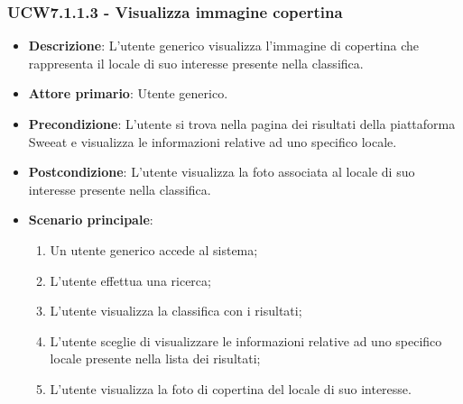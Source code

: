\subsubsection{UCW7.1.1.3 - Visualizza immagine copertina}
\begin{itemize}
	\item \textbf{Descrizione}: L'utente generico visualizza l'immagine di copertina che rappresenta il locale di suo interesse presente nella classifica.
    \item \textbf{Attore primario}: Utente generico.
    \item \textbf{Precondizione}: L’utente si trova nella pagina dei risultati della piattaforma Sweeat e visualizza le informazioni relative ad uno specifico locale.
    \item \textbf{Postcondizione}: L’utente visualizza la foto associata al locale di suo interesse presente nella classifica.
    \item \textbf{Scenario principale}: 
    \begin{enumerate}
        \item Un utente generico accede al sistema;
        \item L’utente effettua una ricerca;
        \item L'utente visualizza la classifica con i risultati;
        \item L'utente sceglie di visualizzare le informazioni relative ad uno specifico locale presente nella lista dei risultati;
        \item L'utente visualizza la foto di copertina del locale di suo interesse.
    \end{enumerate}
\end{itemize}

